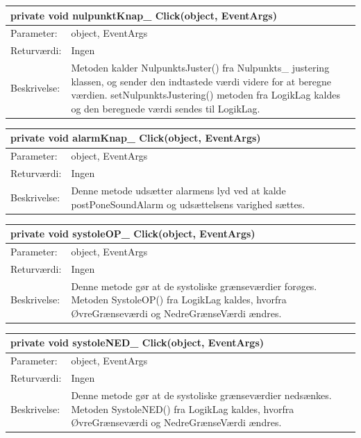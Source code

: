 \begin{table}[H]
\label{tab:tabel2}
\begin{tabular}{| l | p{13cm} |}
   \hline
   \multicolumn{2}{|l|}{private void nulpunktKnap\_ Click(object, EventArgs)} \\ \hline
   Parameter: & object, EventArgs\\ \hline
   Returværdi: & Ingen \\ \hline
   Beskrivelse: & Metoden kalder NulpunktsJuster() fra Nulpunkts\_ justering klassen, og sender den indtastede værdi videre for at beregne værdien. setNulpunktsJustering() metoden fra LogikLag kaldes og den beregnede værdi sendes til LogikLag.\\ \hline
\end{tabular}
\end{table}
\begin{table}[H]
\label{tab:tabel2}
\begin{tabular}{| l | p{13cm} |}
   \hline
   \multicolumn{2}{|l|}{private void alarmKnap\_ Click(object, EventArgs)} \\ \hline
   Parameter: & object, EventArgs\\ \hline
   Returværdi: & Ingen \\ \hline
   Beskrivelse: & Denne metode udsætter alarmens lyd ved at kalde postPoneSoundAlarm og udsættelsens varighed sættes.\\ \hline
\end{tabular}
\end{table}
\begin{table}[H]
\label{tab:tabel2}
\begin{tabular}{| l | p{13cm} |}
   \hline
   \multicolumn{2}{|l|}{private void systoleOP\_ Click(object, EventArgs)} \\ \hline
   Parameter: & object, EventArgs\\ \hline
   Returværdi: & Ingen \\ \hline
   Beskrivelse: & Denne metode gør at de systoliske grænseværdier forøges. Metoden SystoleOP() fra LogikLag kaldes, hvorfra ØvreGrænseværdi og NedreGrænseVærdi ændres.\\ \hline
\end{tabular}
\end{table}
\begin{table}[H]
\label{tab:tabel2}
\begin{tabular}{| l | p{13cm} |}
   \hline
   \multicolumn{2}{|l|}{private void systoleNED\_ Click(object, EventArgs)} \\ \hline
   Parameter: & object, EventArgs\\ \hline
   Returværdi: & Ingen \\ \hline
   Beskrivelse: & Denne metode gør at de systoliske grænseværdier nedsænkes. Metoden SystoleNED() fra LogikLag kaldes, hvorfra ØvreGrænseværdi og NedreGrænseVærdi ændres.\\ \hline
\end{tabular}
\end{table}
